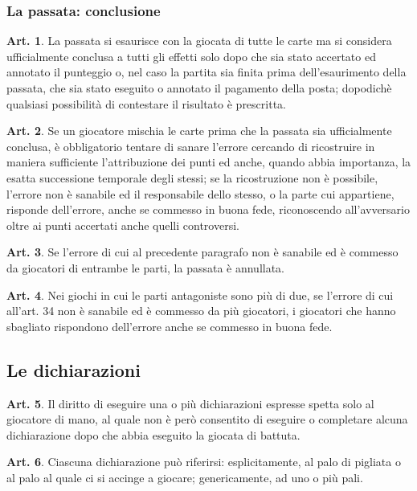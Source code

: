 \documentclass[italian,a4paper]{article}
\theoremstyle{definition}
\newtheorem{art}{Art.}
\begin{document}
\subsubsection{La passata: conclusione}
\begin{art}
    La passata si esaurisce con la giocata di tutte le carte ma si considera ufficialmente conclusa a tutti gli effetti solo dopo che sia stato accertato ed annotato il punteggio o, nel caso la partita sia finita prima dell'esaurimento della passata, che sia stato eseguito o annotato il pagamento della posta; dopodichè qualsiasi possibilità di contestare il risultato è prescritta.
\end{art}
\begin{art}
    Se un giocatore mischia le carte prima che la passata sia ufficialmente conclusa, è obbligatorio tentare di sanare l'errore cercando di ricostruire in maniera sufficiente l'attribuzione dei punti ed anche, quando abbia importanza, la esatta successione temporale degli stessi; se la ricostruzione non è possibile, l'errore non è sanabile ed il responsabile dello stesso, o la parte cui appartiene, risponde dell'errore, anche se commesso in buona fede, riconoscendo all'avversario oltre ai punti accertati anche quelli controversi.
\end{art}
\begin{art}
    Se l'errore di cui al precedente paragrafo non è sanabile ed è commesso da giocatori di entrambe le parti, la passata è annullata.
\end{art}
\begin{art}
    Nei giochi in cui le parti antagoniste sono più di due, se l'errore di cui all'art. 34 non è sanabile ed è commesso da più giocatori, i giocatori che hanno sbagliato rispondono dell'errore anche se commesso in buona fede.
\end{art}
\subsection{Le dichiarazioni}
\begin{art}
    Il diritto di eseguire una o più dichiarazioni espresse spetta solo al giocatore di mano, al quale non è però consentito di  eseguire o completare alcuna dichiarazione dopo che abbia eseguito la giocata di battuta.
\end{art}
\begin{art}
    Ciascuna dichiarazione può riferirsi: esplicitamente, al palo di pigliata o al palo al quale ci si accinge a giocare;  genericamente, ad uno o più pali.
\end{art}
\end{document}
